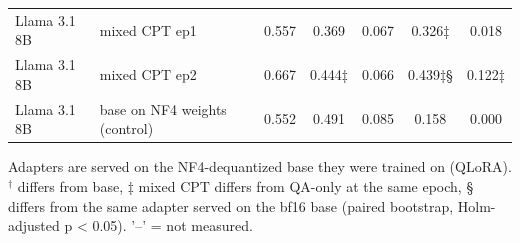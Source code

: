 \begin{table}[t]
{\begin{tabular}{llccccc}
Llama 3.1 8B & mixed CPT ep1 & 0.557 & 0.369 & 0.067 & 0.326‡ & 0.018 \\
Llama 3.1 8B & mixed CPT ep2 & 0.667 & 0.444‡ & 0.066 & 0.439‡§ & 0.122‡ \\
Llama 3.1 8B & base on NF4 weights (control) & 0.552 & 0.491 & 0.085 & 0.158 & 0.000 \\
\bottomrule
\end{tabular}}
\par\smallskip\footnotesize Adapters are served on the NF4-dequantized base they were trained on (QLoRA). $^\dagger$ differs from base, ‡ mixed CPT differs from QA-only at the same epoch, § differs from the same adapter served on the bf16 base (paired bootstrap, Holm-adjusted p < 0.05). '–' = not measured.
\end{table}
